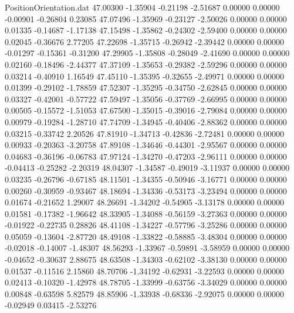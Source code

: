 \begin{filecontents}{PositionOrientation.dat}
  47.00300   -1.35904   -0.21198    -2.51687    0.00000    0.00000   -0.00901   -0.26804    0.23085
  47.07496   -1.35969   -0.23127    -2.50026    0.00000    0.00000    0.01335   -0.14687   -1.17138
  47.15498   -1.35862   -0.24302    -2.59400    0.00000    0.00000    0.02045   -0.36676    2.77205
  47.22698   -1.35715   -0.26942    -2.39442    0.00000    0.00000   -0.01297   -0.15361   -0.31200
  47.29905   -1.35808   -0.28049    -2.41690    0.00000    0.00000    0.02160   -0.18496   -2.44377
  47.37109   -1.35653   -0.29382    -2.59296    0.00000    0.00000    0.03214   -0.40910    1.16549
  47.45110   -1.35395   -0.32655    -2.49971    0.00000    0.00000    0.01399   -0.29102   -1.78859
  47.52307   -1.35295   -0.34750    -2.62845    0.00000    0.00000    0.03327   -0.42001   -0.57722
  47.59497   -1.35056   -0.37769    -2.66995    0.00000    0.00000    0.00505   -0.15572   -1.51053
  47.67500   -1.35015   -0.39016    -2.79084    0.00000    0.00000    0.00979   -0.19284   -1.28710
  47.74709   -1.34945   -0.40406    -2.88362    0.00000    0.00000    0.03215   -0.33742    2.20526
  47.81910   -1.34713   -0.42836    -2.72481    0.00000    0.00000    0.00933   -0.20363   -3.20758
  47.89108   -1.34646   -0.44301    -2.95567    0.00000    0.00000    0.04683   -0.36196   -0.06783
  47.97124   -1.34270   -0.47203    -2.96111    0.00000    0.00000   -0.04413   -0.25282   -2.20319
  48.04307   -1.34587   -0.49019    -3.11937    0.00000    0.00000    0.03235   -0.26796   -0.67185
  48.11501   -1.34355   -0.50946    -3.16771    0.00000    0.00000    0.00260   -0.30959   -0.93467
  48.18694   -1.34336   -0.53173    -3.23494    0.00000    0.00000    0.01674   -0.21652    1.29007
  48.26691   -1.34202   -0.54905    -3.13178    0.00000    0.00000    0.01581   -0.17382   -1.96642
  48.33905   -1.34088   -0.56159    -3.27363    0.00000    0.00000   -0.01922   -0.22735    0.28826
  48.41108   -1.34227   -0.57796    -3.25286    0.00000    0.00000    0.05059   -0.13604   -2.87720
  48.49108   -1.33822   -0.58885    -3.48304    0.00000    0.00000   -0.02018   -0.14007   -1.48307
  48.56293   -1.33967   -0.59891    -3.58959    0.00000    0.00000   -0.04652   -0.30637    2.88675
  48.63508   -1.34303   -0.62102    -3.38130    0.00000    0.00000    0.01537   -0.11516    2.15860
  48.70706   -1.34192   -0.62931    -3.22593    0.00000    0.00000    0.02413   -0.10320   -1.42978
  48.78705   -1.33999   -0.63756    -3.34029    0.00000    0.00000    0.00848   -0.63598    5.82579
  48.85906   -1.33938   -0.68336    -2.92075    0.00000    0.00000   -0.02949    0.03415   -2.53276

\end{filecontents}
